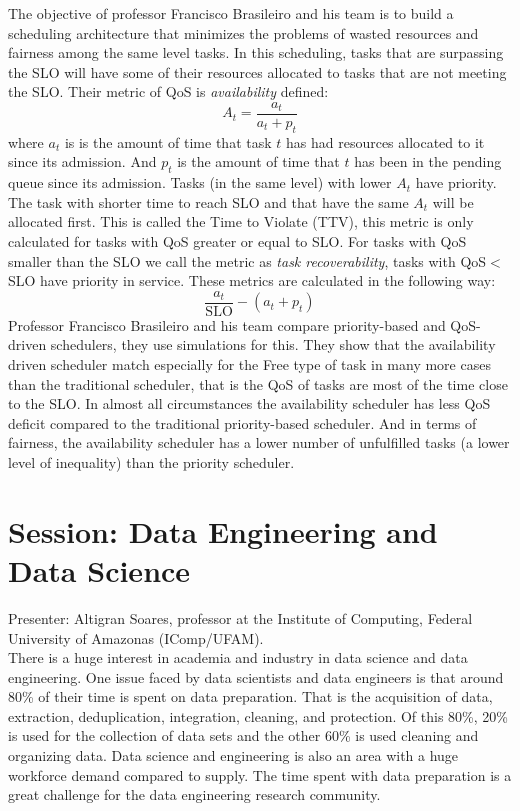 \documentclass[9pt,a4paper]{article}
\begin{document}
The objective of professor Francisco Brasileiro and his team is to build a scheduling architecture that minimizes the problems of wasted resources and fairness among the same level tasks. In this scheduling, tasks that are surpassing the SLO will have some of their resources allocated to tasks that are not meeting the SLO. Their metric of QoS is \textit{availability} defined: 
$$ A_t = \frac{a_t}{a_t+p_t} $$
where $a_t$ is is the amount of time that task $t$ has had resources allocated to it since its admission. And $p_t$ is the amount of time that $t$ has been in the pending queue since its admission. Tasks (in the same level) with lower $A_t$ have priority. The task with shorter time to reach SLO and that have the same $A_t$ will be allocated first. This is called the Time to Violate (TTV), this metric is only calculated for tasks with QoS greater or equal to SLO. For tasks with QoS smaller than the SLO we call the metric as \textit{task recoverability}, tasks with QoS$<$SLO have priority in service. These metrics are calculated in the following way:
$$ \frac{a_t}{\text{SLO}} - (a_t+p_t) $$
Professor Francisco Brasileiro and his team compare priority-based and QoS-driven schedulers, they use simulations for this. They show that the availability driven scheduler match especially for the Free type of task in many more cases than the traditional scheduler, that is the QoS of tasks are most of the time close to the SLO. 
In almost all circumstances the availability scheduler has less QoS deficit compared to the traditional priority-based scheduler. And in terms of fairness, the availability scheduler has a lower number of unfulfilled tasks (a lower level of inequality) than the priority scheduler.


\section*{Session: Data Engineering and Data Science}

Presenter: Altigran Soares, professor at the Institute of Computing, Federal University of Amazonas (IComp/UFAM).\\

There is a huge interest in academia and industry in data science and data engineering. 
One issue faced by data scientists and data engineers is that around 80\% of their time is spent on data preparation. 
That is the acquisition of data, extraction, deduplication, integration, cleaning, and protection. Of this 80\%, 20\% is used for the collection of data sets and the other  60\% is used cleaning and organizing data.
Data science and engineering is also an area with a huge workforce demand compared to supply. 
The time spent with data preparation is a great challenge for the data engineering research community.
\end{document}

